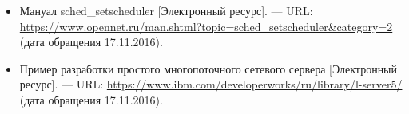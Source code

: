 \documentclass[14pt,a4paper,report]{report}
\begin{document}
\begin{itemize}
	\item Мануал sched\_setscheduler [Электронный ресурс]. — URL: \href{https://www.opennet.ru/man.shtml?topic=sched_setscheduler&category=2}{https://www.opennet.ru/man.shtml?topic=sched\linebreak \_setscheduler\&category=2} (дата обращения 17.11.2016).
	
	\item Пример разработки простого многопоточного сетевого сервера [Электронный ресурс]. — URL: \href{https://www.ibm.com/developerworks/ru/library/l-server5/}{https://www.\linebreak ibm.com/developerworks/ru/library/l-server5/} (дата обращения 17.11.2016).
	
\end{itemize}
\end{document}
